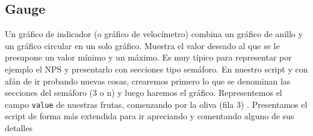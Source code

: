 \documentclass[
]{book}
\begin{document}
\hypertarget{gauge}{%
\subsection{Gauge}\label{gauge}}

Un gráfico de indicador (o gráfico de velocímetro) combina un gráfico de anillo y un gráfico circular en un solo gráfico. Muestra el valor deseado al que se le presupone un valor mínimo y un máximo. Es muy típico para representar por ejemplo el NPS y presentarlo con secciones tipo semáforo. En nuestro script y con afán de ir probando nuevas cosas, crearemos primero lo que se denominan las secciones del semáforo (3 o n) y luego haremos el gráfico. Representemos el campo \texttt{value} de nuestras frutas, comenzando por la oliva (fila 3) . Presentamos el script de forma más extendida para ir apreciando y comentando alguno de sus detalles
\end{document}
